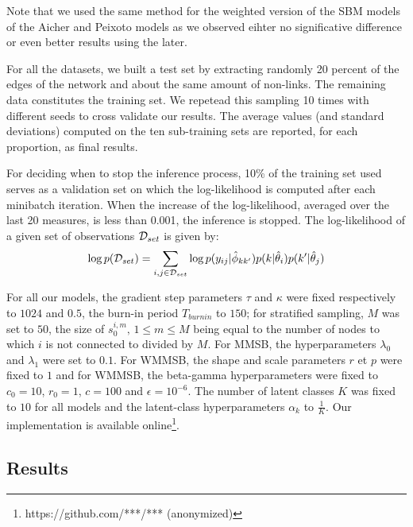 Note that we used the same method for the weighted version of the SBM models of the Aicher and Peixoto models as we observed eihter no significative difference or even better results using the later.

For all the datasets, we built a test set by extracting randomly 20 percent of the edges of the network and about the same amount of non-links. The remaining data constitutes the training set. We repetead this sampling 10  times with different seeds to cross validate our results. The average values (and standard deviations) computed on the ten sub-training sets are reported, for each proportion, as final results.

For deciding when to stop the inference process, 10\% of the training set used serves as a validation set on which the log-likelihood is computed after each minibatch iteration. When the increase of the log-likelihood, averaged over the last 20 measures, is less than 0.001, the inference is stopped. The log-likelihood of a given set of observations $\mathcal{D}_{set}$  is given by:
\begin{equation*}
\log p(\mathcal{D}_{set}) = \sum_{i,j \in \mathcal{D}_{set}} \log p(y_{ij} | \hat\phi_{kk'}) p(k|\hat\theta_i) p(k'|\hat\theta_j)
\end{equation*}

For all our models, the gradient step parameters  $\tau$ and $\kappa$ were fixed respectively to  $1024$ and $0.5$, the burn-in period $T_{burnin}$ to $150$; for stratified sampling, $M$ was set to $50$, the size of $s_0^{i,m}, \, 1 \le m \le M$ being equal to the number of nodes to which $i$ is not connected to divided by $M$. For MMSB, the hyperparameters $\lambda_0$ and $\lambda_1$ were set to $0.1$. For WMMSB, the shape and scale parameters $r$ et $p$ were fixed to $1$ and for WMMSB, the beta-gamma hyperparameters were fixed to  $c_0=10$, $r_0=1$, $c=100$ and $\epsilon=10^{-6}$. The number of latent classes $K$ was fixed to $10$ for all models and the latent-class hyperparameters $\alpha_k$ to $\frac{1}{K}$. Our implementation is available online\footnote{https://github.com/***/*** (anonymized)}. 


\begin{table*}[t]
\centering
	
\label{table:mse}
\end{table*}

\subsection{Results}


